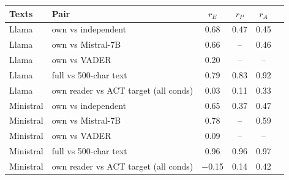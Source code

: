 \begin{tabular}{llcccc}
\toprule
Texts & Pair & $r_E$ & $r_P$ & $r_A$ & \\
\midrule
Llama & own vs independent & 0.68 & 0.47 & 0.45 & \\
Llama & own vs Mistral-7B & 0.66 & -- & 0.46 & \\
Llama & own vs VADER & 0.20 & -- & -- & \\
Llama & full vs 500-char text & 0.79 & 0.83 & 0.92 & \\
Llama & own reader vs ACT target (all conds) & 0.03 & 0.11 & 0.33 & \\
Ministral & own vs independent & 0.65 & 0.37 & 0.47 & \\
Ministral & own vs Mistral-7B & 0.78 & -- & 0.59 & \\
Ministral & own vs VADER & 0.09 & -- & -- & \\
Ministral & full vs 500-char text & 0.96 & 0.96 & 0.97 & \\
Ministral & own reader vs ACT target (all conds) & $-$0.15 & 0.14 & 0.42 & \\
\bottomrule
\end{tabular}
